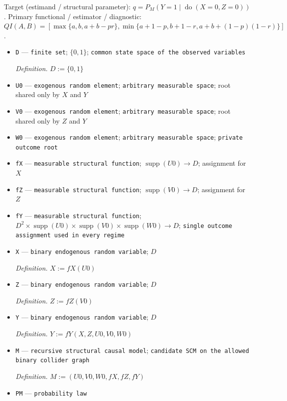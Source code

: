 \documentclass{article}
\begin{document}
Target (estimand / structural parameter): \(q=P_M(Y=1\mid\operatorname{do}(X=0,Z=0))\).
Primary functional / estimator / diagnostic: \(QI(A,B)=[\max\{a,b,a+b-pr\},\min\{a+1-p,b+1-r,a+b+(1-p)(1-r)\}]\).
\begin{itemize}
  \item \texttt{D} --- \texttt{finite set}; \(\{0,1\}\); \texttt{common state space of the observed variables}
  \par\smallskip\noindent\emph{Definition.} \(D:=\{0,1\}\)
  \item \texttt{U0} --- \texttt{exogenous random element}; \texttt{arbitrary measurable space}; root shared only by \(X\) and \(Y\)
  \item \texttt{V0} --- \texttt{exogenous random element}; \texttt{arbitrary measurable space}; root shared only by \(Z\) and \(Y\)
  \item \texttt{W0} --- \texttt{exogenous random element}; \texttt{arbitrary measurable space}; \texttt{private outcome root}
  \item \texttt{fX} --- \texttt{measurable structural function}; \(\operatorname{supp}(U0)\to D\); assignment for \(X\)
  \item \texttt{fZ} --- \texttt{measurable structural function}; \(\operatorname{supp}(V0)\to D\); assignment for \(Z\)
  \item \texttt{fY} --- \texttt{measurable structural function}; \(D^2\times\operatorname{supp}(U0)\times\operatorname{supp}(V0)\times\operatorname{supp}(W0)\to D\); \texttt{single outcome assignment used in every regime}
  \item \texttt{X} --- \texttt{binary endogenous random variable}; \(D\)
  \par\smallskip\noindent\emph{Definition.} \(X:=fX(U0)\)
  \item \texttt{Z} --- \texttt{binary endogenous random variable}; \(D\)
  \par\smallskip\noindent\emph{Definition.} \(Z:=fZ(V0)\)
  \item \texttt{Y} --- \texttt{binary endogenous random variable}; \(D\)
  \par\smallskip\noindent\emph{Definition.} \(Y:=fY(X,Z,U0,V0,W0)\)
  \item \texttt{M} --- \texttt{recursive structural causal model}; \texttt{candidate SCM on the allowed binary collider graph}
  \par\smallskip\noindent\emph{Definition.} \(M:=(U0,V0,W0,fX,fZ,fY)\)
  \item \texttt{PM} --- \texttt{probability law}

\end{itemize}
\end{document}
